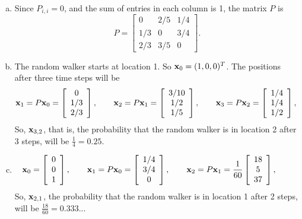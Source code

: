 \vspace{2mm}
\begin{enumerate}[a)]
  \item Since $P_{i,i}=0$, and the sum of entries in each column is 1, the matrix $P$ is
$$
P=\left[\begin{array}{ccc}0&2/5&1/4\\1/3&0&3/4\\2/3&3/5&0\end{array}\right].
$$
	\item The random walker starts at location 1. So ${\bf x}_0=(1,0,0)^T$. The positions after three time steps will be
$$
{\bf x}_1=P{\bf x}_0=\left[\begin{array}{c}0\\1/3\\2/3\end{array}\right],\qquad
{\bf x}_2=P{\bf x}_1=\left[\begin{array}{c}3/10\\1/2\\1/5\end{array}\right],\qquad
{\bf x}_3=P{\bf x}_2=\left[\begin{array}{c}1/4\\1/4\\1/2\end{array}\right],\qquad
$$
So, ${\bf x}_{3,2}$, that is, the probability that the random walker is in location 2 after 3 steps, will be $\frac{1}{4}=0.25$.
	\item
$$
{\bf x}_0=\left[\begin{array}{c}0\\0\\1\end{array}\right],\qquad
{\bf x}_1=P{\bf x}_0=\left[\begin{array}{c}1/4\\3/4\\0\end{array}\right],\qquad
{\bf x}_2=P{\bf x}_1=\frac{1}{60}\left[\begin{array}{c}18\\5\\37\end{array}\right],\qquad
$$
So, ${\bf x}_{2,1}$, the probability that the random walker is in location 1 after 2 steps, will be $\frac{18}{60}=0.333..$.
\end{enumerate}
